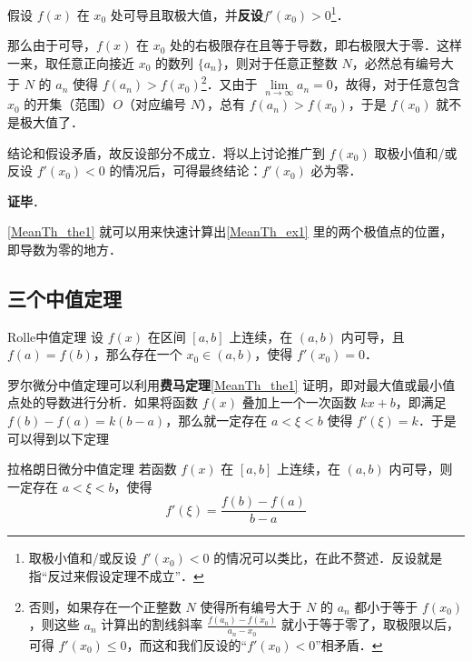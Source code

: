假设 $f(x)$ 在 $x_0$ 处可导且取极大值，并\textbf{反设}$f'(x_0)>0$\footnote{取极小值和/或反设 $f'(x_0)<0$ 的情况可以类比，在此不赘述．反设就是指“反过来假设定理不成立”．}．

那么由于可导，$f(x)$ 在 $x_0$ 处的右极限存在且等于导数，即右极限大于零．这样一来，取任意正向接近 $x_0$ 的数列 $\{a_n\}$，则对于任意正整数 $N$，必然总有编号大于 $N$ 的 $a_n$ 使得 $f(a_n)>f(x_0)$\footnote{否则，如果存在一个正整数 $N$ 使得所有编号大于 $N$ 的 $a_n$ 都小于等于 $f(x_0)$，则这些 $a_n$ 计算出的割线斜率 $\frac{f(a_n)-f(x_0)}{a_n-x_0}$ 就小于等于零了，取极限以后，可得 $f'(x_0)\leq 0$，而这和我们反设的“$f'(x_0)<0$”相矛盾．}．又由于 $\lim\limits_{n\to\infty}a_n=0$，故得，对于任意包含 $x_0$ 的开集（范围）$O$（对应编号 $N$），总有 $f(a_n)>f(x_0)$，于是 $f(x_0)$ 就不是极大值了．

结论和假设矛盾，故反设部分不成立．将以上讨论推广到 $f(x_0)$ 取极小值和/或反设 $f'(x_0)<0$ 的情况后，可得最终结论：$f'(x_0)$ 必为零．

\textbf{证毕}．

\autoref{MeanTh_the1} 就可以用来快速计算出\autoref{MeanTh_ex1} 里的两个极值点的位置，即导数为零的地方．


\subsection{三个中值定理}


\begin{definition}{Rolle中值定理}
设 $f(x)$ 在区间 $[a, b]$ 上连续，在 $(a, b)$ 内可导，且 $f(a)=f(b)$，那么存在一个 $x_0\in(a, b)$，使得 $f'(x_0)=0$．
\end{definition}

罗尔微分中值定理可以利用\textbf{费马定理}\autoref{MeanTh_the1} 证明，即对最大值或最小值点处的导数进行分析．如果将函数 $f(x)$ 叠加上一个一次函数 $kx+b$，即满足 $f(b)-f(a)=k(b-a)$，那么就一定存在 $a< \xi <b$ 使得 $f'(\xi)=k$．于是可以得到以下定理

\begin{theorem}{拉格朗日微分中值定理}\label{MeanTh_the2}
若函数 $f(x)$ 在 $[a,b]$ 上连续，在 $(a,b)$ 内可导，则一定存在 $a< \xi <b$，使得
\begin{equation}
f'(\xi)=\frac{f(b)-f(a)}{b-a}
\end{equation}
\end{theorem}

